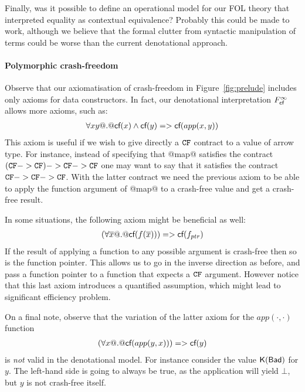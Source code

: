 Finally, was it possible to define an operational model for our FOL theory that interpreted
equality as contextual equivalence? Probably this could be made to work, although we believe
that the formal clutter from syntactic manipulation of terms could be worse than the current
denotational approach. 


\paragraph{Polymorphic crash-freedom}

Observe that our axiomatisation of crash-freedom in Figure~\ref{fig:prelude} 
includes only axioms for data constructors. In fact, our denotational interpretation
$F_{\textsf{cf}}^{\infty}$ allows more axioms, such as:
\[\begin{array}{l}
    \forall x y @.@ \textsf{cf}(x) \land \textsf{cf}(y) => \textsf{cf}(app(x,y))
\end{array}\] 
This axiom is useful if we wish to give directly a ${\tt CF}$ contract to a value of 
arrow type. For instance, instead of specifying that @map@ satisfies the contract
$({\tt CF} -> {\tt CF}) -> {\tt CF} -> {\tt CF}$ one may want to say that it satisfies the contract
${\tt CF} -> {\tt CF} -> {\tt CF}$. With the latter contract we need the previous axiom to be 
able to apply the function argument of @map@ to a crash-free value and get a 
crash-free result. 

In some situations, the following axiom might be beneficial as well:
\[\begin{array}{l}
    (\forall \overline{x} @.@ \textsf{cf}(f(\overline{x}))) => \textsf{cf}(f_{ptr})
\end{array}\]
If the result of applying a function to any possible argument is crash-free then 
so is the function pointer. This allows us to go in the inverse direction as before, 
and pass a function pointer to a function that expects a ${\tt CF}$ argument. However notice
that this last axiom introduces a quantified assumption, which might lead to significant
efficiency problem.

On a final note, observe that the variation of the latter axiom for the 
$app(\cdot,\cdot)$ function
\[\begin{array}{l}
   (\forall x @.@ \textsf{cf}(app(y,x))) => \textsf{cf}(y)
\end{array}\]
is {\em not} valid in the denotational model. For instance consider the
value $\mathsf{K}(\mathsf{Bad})$ for $y$. The left-hand side is going to always 
be true, as the application will yield $\bot$, but $y$ is not crash-free 
itself.


